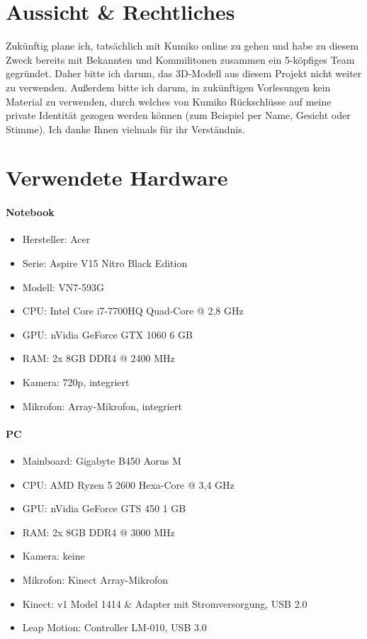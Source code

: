 \documentclass[a4paper, 12pt]{article}
\begin{document}
\section{Aussicht \& Rechtliches}
\label{sec:later}
Zukünftig plane ich, tatsächlich mit Kumiko online zu gehen
und habe zu diesem Zweck bereits mit Bekannten und Kommilitonen
zusammen ein 5-köpfiges Team gegründet.
Daher bitte ich darum,
das 3D-Modell aus diesem Projekt nicht weiter zu verwenden.
Außerdem bitte ich darum,
in zukünftigen Vorlesungen kein Material zu verwenden,
durch welches von Kumiko Rückschlüsse
auf meine private Identität gezogen werden können
(zum Beispiel per Name, Gesicht oder Stimme).
Ich danke Ihnen vielmals für ihr Verständnis.
\newpage

\section{Verwendete Hardware}
\label{sec:hardware}
\paragraph{Notebook}
\begin{itemize}
    \item Hersteller: {\ttfamily Acer}
    \item Serie: {\ttfamily Aspire V15 Nitro Black Edition}
    \item Modell: {\ttfamily VN7-593G}
    \item CPU: {\ttfamily Intel Core i7-7700HQ Quad-Core @ 2,8 GHz}
    \item GPU: {\ttfamily nVidia GeForce GTX 1060 6 GB}
    \item RAM: {\ttfamily 2x 8GB DDR4 @ 2400 MHz}
    \item Kamera: {\ttfamily 720p, integriert}
    \item Mikrofon: {\ttfamily Array-Mikrofon, integriert}
\end{itemize}
\paragraph{PC}
\begin{itemize}
    \item Mainboard: {\ttfamily Gigabyte B450 Aorus M}
    \item CPU: {\ttfamily AMD Ryzen 5 2600 Hexa-Core @ 3,4 GHz}
    \item GPU: {\ttfamily nVidia GeForce GTS 450 1 GB}
    \item RAM: {\ttfamily 2x 8GB DDR4 @ 3000 MHz}
    \item Kamera: {\ttfamily keine}
    \item Mikrofon: {\ttfamily Kinect Array-Mikrofon}
    \item Kinect: {\ttfamily v1 Model 1414} \& {\ttfamily Adapter mit Stromversorgung, USB 2.0}
    \item Leap Motion: {\ttfamily Controller LM-010, USB 3.0}
\end{itemize}

\clearpage
\printbibliography[heading=bibintoc]
\end{document}
